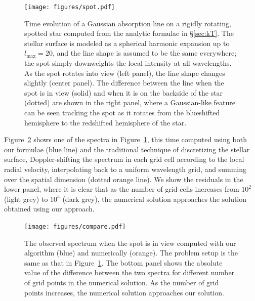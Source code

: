 \documentclass[modern]{aastex631}
\begin{document}
\begin{figure}[p!]
    \begin{centering}
        \texttt{[image: figures/spot.pdf]}
        \caption{%
            Time evolution of a Gaussian absorption line on a rigidly rotating, spotted star computed from the analytic formulae in \S\ref{sec:kT}.
            The stellar surface is modeled as a spherical harmonic expansion up to $l_\mathrm{max}=20$, and the line shape is assumed to be the same everywhere;
            the spot simply downweights the local intensity at all wavelengths.
            As the spot rotates into view (left panel), the line shape changes slightly (center panel). 
            The difference between the line when the spot is in view (solid) and when it is on the backside of the star (dotted) are shown in the right panel, where a Gaussian-like feature can be seen tracking the spot as it rotates from the blueshifted hemisphere to the redshifted hemisphere of the star.
        }
        \label{fig:spot}
    \end{centering}
\end{figure}

Figure~\ref{fig:compare} shows one of the spectra in Figure~\ref{fig:spot}, this time computed using both our formulae (blue line) and the traditional technique of discretizing the stellar surface, Doppler-shifting the spectrum in each grid cell according to the local radial velocity, interpolating back to a uniform wavelength grid, and summing over the spatial dimension (dotted orange line). 
We show the residuals in the lower panel, where it is clear that as the number of grid cells increases from $10^2$ (light grey) to $10^5$ (dark grey), the numerical solution approaches the solution obtained using our approach.


\begin{figure}[t!]
    \begin{centering}
        \texttt{[image: figures/compare.pdf]}
        \caption{%
            The observed spectrum when the spot is in view computed with our algorithm (blue) and numerically (orange). 
            The problem setup is the same as that in Figure~\ref{fig:spot}. 
            The bottom panel shows the absolute value of the difference between the two spectra for different number of grid points in the numerical solution.
            As the number of grid points increases, the numerical solution approaches our solution.
        }
        \label{fig:compare}
    \end{centering}
\end{figure}
\end{document}

